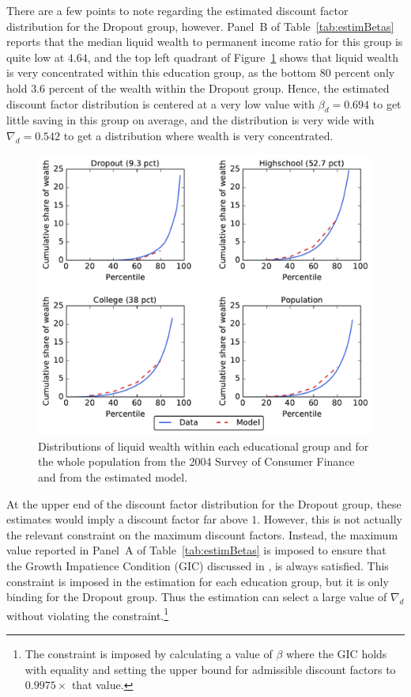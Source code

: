\documentclass[../HAFiscal]{subfiles}
\begin{document}
There are a few points to note regarding the estimated discount factor distribution for the Dropout group, however. Panel~B of Table~\ref{tab:estimBetas} reports that the median liquid wealth to permanent income ratio for this group is quite low at $4.64$, and the top left quadrant of Figure~\ref{fig:LorenzPts} shows that liquid wealth is very concentrated within this education group, as the bottom 80 percent only hold $3.6$ percent of the wealth within the Dropout group. Hence, the estimated discount factor distribution is centered at a very low value with $\beta_d=0.694$ to get little saving in this group on average, and the distribution is very wide with $\nabla_d=0.542$ to get a distribution where wealth is very concentrated. 

\begin{figure}[th]
\begin{center}
	\includegraphics[width=.9\textwidth]{../Figures/LorenzPoints.pdf}
	\caption{Distributions of liquid wealth within each educational group and for the whole population from the 2004 Survey of Consumer Finance and from the estimated model.}
	\label{fig:LorenzPts}
\end{center}
\end{figure}

At the upper end of the discount factor distribution for the Dropout group, these estimates would imply a discount factor far above $1$. However, this is not actually the relevant constraint on the maximum discount factors. Instead, the maximum value reported in Panel~A of Table~\ref{tab:estimBetas} is imposed to ensure that the Growth Impatience Condition (GIC) discussed in \cite{carroll2022theoretical}, is always satisfied. This constraint is imposed in the estimation for each education group, but it is only binding for the Dropout group. Thus the estimation can select a large value of $\nabla_d$ without violating the constraint.\footnote{The constraint is imposed by calculating a value of $\beta$ where the GIC holds with equality and setting the upper bound for admissible discount factors to $0.9975 \times$ that value.}
\end{document}
